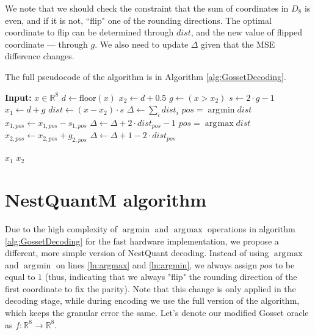 \documentclass{article}
\DeclareMathOperator*{\argmin}{\arg\!\min}
\DeclareMathOperator*{\argmax}{\arg\!\max}
\theoremstyle{plain}
\theoremstyle{definition}
\theoremstyle{remark}
\begin{document}
We note that we should check the constraint that the sum of coordinates in $D_8$ is even, and if it is not, ``flip" one of the rounding directions. The optimal coordinate to flip can be determined through $dist$, and the new value of flipped coordinate --- through $g$. We also need to update $\Delta$ given that the MSE difference changes.

The full pseudocode of the algorithm is in Algorithm \ref{alg:GossetDecoding}.

\begin{algorithm}[H]
\caption{Oracle for the Gosset lattice}
\label{alg:GossetDecoding}
\begin{algorithmic}[1]

\State \textbf{Input:} $x \in \mathbb{R}^8$
\State $d \leftarrow \text{floor}(x)$
\State $x_2 \leftarrow d + 0.5$
\State $g \leftarrow (x > x_2)$
\State $s \leftarrow 2 \cdot g - 1$
\State $x_1 \leftarrow d + g$
\State $dist \leftarrow (x - x_2) \cdot s$
\State $\Delta \leftarrow \sum_i dist_i$
    \State $pos = \argmin dist$ \label{ln:argmax}
    \State $x_{1, pos} \leftarrow x_{1, pos} - s_{1, pos}$
    \State $\Delta \leftarrow \Delta + 2 \cdot dist_{pos} - 1$
\EndIf
{}
    \State $pos = \argmax dist$ \label{ln:argmin}
    \State $x_{2, pos} \leftarrow x_{2, pos} + g_{2, pos}$
    \State $\Delta \leftarrow \Delta + 1 - 2 \cdot dist_{pos}$
\EndIf

   \State \Return $x_1$
\Else
   \State \Return $x_2$
\EndIf

\end{algorithmic}
\end{algorithm}

\section{NestQuantM algorithm}

\label{sec:nestquantm}

Due to the high complexity of $\argmin$ and $\argmax$ operations in algorithm \ref{alg:GossetDecoding} for the fast hardware implementation, we propose a different, more simple version of NestQuant decoding. Instead of using $\argmax$ and $\argmin$ on lines \ref{ln:argmax} and \ref{ln:argmin}, we always assign $pos$ to be equal to $1$ (thus, indicating that we always "flip" the rounding direction of the first coordinate to fix the parity). Note that this change is only applied in the decoding stage, while during encoding we use the full version of the algorithm, which keeps the granular error the same. Let's denote our modified Gosset oracle as $f\colon \mathbb{R}^8 \to \mathbb{R}^8$.
\end{document}
